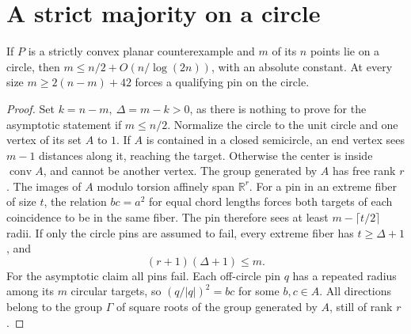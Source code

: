 \section{A strict majority on a circle}

\begin{theorem}
If \(P\) is a strictly convex planar counterexample and \(m\) of its \(n\) points lie
on a circle, then \(m\le n/2+O(n/\log(2n))\), with an absolute constant.
At every size \(m\ge 2(n-m)+42\) forces a qualifying pin on the circle.
\end{theorem}

\begin{proof}
Set \(k=n-m,\ \Delta=m-k>0\), as there is nothing to prove for the asymptotic statement if \(m\le n/2\).
Normalize the circle to the unit circle and one vertex of its set \(A\) to \(1\).
If \(A\) is contained in a closed semicircle, an end vertex sees \(m-1\) distances along it, reaching the target. Otherwise the center is inside \(\operatorname{conv} A\), and cannot be another vertex.
The group generated by \(A\) has free rank \(r\). The images of \(A\) modulo torsion affinely span \(\mathbb R^r\). For a pin in an extreme fiber of size \(t\), the relation \(bc=a^2\) for equal chord lengths forces both targets of each coincidence to be in the same fiber. The pin therefore sees at least \(m-\lceil t/2\rceil\) radii. If only the circle pins are assumed to fail, every extreme fiber has \(t\ge\Delta+1\), and
\[
 (r+1)(\Delta+1)\le m. \tag{A}
\]
For the asymptotic claim all pins fail. Each off-circle pin \(q\) has a repeated radius among its \(m\) circular targets, so \((q/|q|)^2=bc\) for some \(b,c\in A\). All directions belong to the group \(\Gamma\) of square roots of the group generated by \(A\), still of rank \(r\).


\end{proof}
